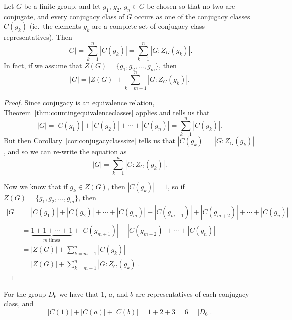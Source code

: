 \begin{theorem}
  Let $G$ be a finite group, and let $g_{1}$, $g_{2}$, $g_{n} \in G$ 
  be chosen so that no two are conjugate, and every conjugacy class 
  of $G$ occurs as one of the conjugacy classes $C(g_{k})$ (ie.~the 
  elements $g_{k}$ are a complete set of conjugacy class 
  representatives).  Then
  \[
    |G| = \sum_{k = 1}^{n} |C(g_{k})| = \sum_{k = 1}^{n} |G : 
    Z_{G}(g_{k})|.
  \]
  In fact, if we assume that $Z(G) = \{g_{1}, g_{2}, \ldots, 
  g_{m}\}$, then
  \[
    |G| = |Z(G)| + \sum_{k = m+1}^{n} |G : Z_{G}(g_{k})|.
  \]
\end{theorem}
\begin{proof}
  Since conjugacy is an equivalence relation, Theorem~\ref{thm:countingequivalenceclasses} 
  applies and tells us that
  \[
    |G| = |C(g_{1})| + |C(g_{2})| + \cdots + |C(g_{n})| = \sum_{k = 1}^{n} |C(g_{k})|.
  \]
  But then Corollary~\ref{cor:conjugacyclasssize} tells us that 
  $|C(g_{k})| = |G : Z_{G}(g_{k})|$, and so we can re-write the equation as
  \[
    |G| = \sum_{k = 1}^{n} |G : Z_{G}(g_{k})|.
  \]
  
  Now we know that if $g_{k} \in Z(G)$, then $|C(g_{k})| = 1$, so if
  $Z(G) = \{g_{1}, g_{2}, \ldots, g_{m}\}$, then
  \begin{align*}
    |G| &= |C(g_{1})| + |C(g_{2})| + \cdots + |C(g_{m})| + |C(g_{m + 1})| + 
    |C(g_{m + 2})| + \cdots + |C(g_{n})| \\
        &= \underbrace{1 + 1 + \cdots + 1}_{m~\text{times}} + |C(g_{m + 1})| + 
    |C(g_{m + 2})| + \cdots + |C(g_{n})| \\
        &= |Z(G)| + \sum_{k = m+1}^{n} |C(g_{k})| \\
        &= |Z(G)| + \sum_{k = m+1}^{n} |G : Z_{G}(g_{k})|.
  \end{align*}
\end{proof}

\begin{example}
  For the group $D_{6}$ we have that $1$, $a$, and $b$ are 
  representatives of each conjugacy class, and
  \[
    |C(1)| + |C(a)| + |C(b)| = 1 + 2 + 3 = 6 = |D_{6}|.
  \]
\end{example}

